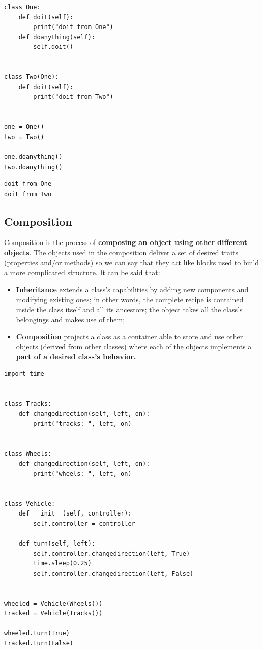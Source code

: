 \documentclass[11pt]{article}
\begin{document}
\begin{verbatim}
class One:
	def doit(self):
		print("doit from One")
	def doanything(self):
		self.doit()


class Two(One):
	def doit(self):
		print("doit from Two")


one = One()
two = Two()

one.doanything()
two.doanything()
\end{verbatim}

\begin{verbatim}
doit from One
doit from Two
\end{verbatim}
\subsection{Composition}
\label{sec:orgbdec1b0}
Composition is the process of \textbf{composing an object using other}
\textbf{different objects}. The objects used in the composition deliver a set
of desired traits (properties and/or methods) so we can say that they
act like blocks used to build a more complicated structure.
It can be said that:

\begin{itemize}
\item \textbf{Inheritance} extends a class’s capabilities by adding new
components and modifying existing ones; in other words, the complete
recipe is contained inside the class itself and all its ancestors;
the object takes all the class’s belongings and makes use of them;
\item \textbf{Composition} projects a class as a container able to store and use
other objects (derived from other classes) where each of the objects
implements a \textbf{part of a desired class’s behavior.}
\end{itemize}

\begin{verbatim}
import time


class Tracks:
	def changedirection(self, left, on):
		print("tracks: ", left, on)


class Wheels:
	def changedirection(self, left, on):
		print("wheels: ", left, on)


class Vehicle:
	def __init__(self, controller):
		self.controller = controller

	def turn(self, left):
		self.controller.changedirection(left, True)
		time.sleep(0.25)
		self.controller.changedirection(left, False)


wheeled = Vehicle(Wheels())
tracked = Vehicle(Tracks())

wheeled.turn(True)
tracked.turn(False)

\end{verbatim}
\end{document}
